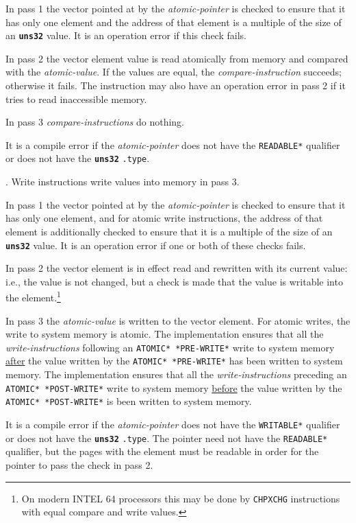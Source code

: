 \documentclass[12pt]{article}
\newcommand{\TT}[1]{{\tt \bfseries #1}}
\newenvironment{indpar}[1][0.3in]%
	{\begin{list}{}%
		     {\setlength{\itemsep}{0in}%
		      \setlength{\topsep}{0in}%
		      \setlength{\parsep}{1ex}%
		      \setlength{\labelwidth}{#1}%
		      \setlength{\leftmargin}{#1}%
		      \addtolength{\leftmargin}{\labelsep}}%
	 \item}%
	{\end{list}}
\begin{document}
\begin{indpar}[0.4in]
In pass 1 the vector pointed at by the {\em atomic-pointer} is checked
to ensure that it has
only one element and the address of that element is a multiple of
the size of an \TT{uns32} value.  It is an operation error if this
check fails.

In pass 2 the vector element value is read atomically from memory and
compared with the {\em atomic-value}.  If the values are equal, the
{\em compare-instruction} succeeds; otherwise it fails.  The instruction
may also have an operation error in pass 2 if it tries to read
inaccessible memory.

In pass 3 {\em compare-instructions} do nothing.


It is a compile error if the {\em atomic-pointer}
does not have the {\tt *READABLE*} qualifier or does not have
the \TT{uns32} {\tt .type}.


\hspace*{-0.2in}{\em \bf Write-Instructions}.
Write instructions write values into memory in pass 3.

In pass 1 the vector pointed at by the {\em atomic-pointer} is checked
to ensure that it has only one element, and for atomic write instructions,
the address of that element is additionally checked to ensure
that it is a multiple of
the size of an \TT{uns32} value.  It is an operation error if one or both
of these checks fails.

In pass 2 the vector element is in effect read and rewritten with its
current value: i.e., the value is not changed, but a check is made that
the value is writable into the element.\footnote{On modern INTEL 64
processors
this may be done by {\tt CHPXCHG} instructions with equal compare and write
values.}

In pass 3 the {\em atomic-value} is written to the vector element.
For atomic writes, the write to system memory is atomic.
The implementation ensures that all the {\em write-instructions}
following an {\tt *ATOMIC* *PRE-WRITE*} write to system memory
\underline{after} the value written by the
{\tt *ATOMIC* *PRE-WRITE*} has been written to system memory.
The implementation ensures that all the {\em write-instructions}
preceding an {\tt *ATOMIC* *POST-WRITE*} write to system memory
\underline{before} the value written by the
{\tt *ATOMIC* *POST-WRITE*} is been written to system memory.

It is a compile error if the {\em atomic-pointer}
does not have the {\tt *WRITABLE*} qualifier or does not have
the \TT{uns32} {\tt .type}.  The pointer need not have the
{\tt *READABLE*} qualifier, but the pages with the element must be readable
in order for the pointer to pass the check in pass 2.
\end{indpar}
\end{document}
